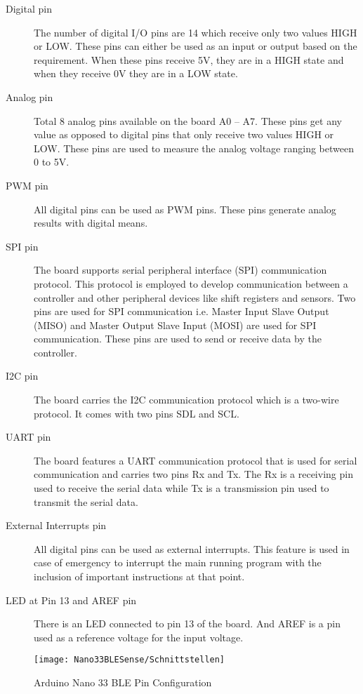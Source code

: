 \begin{description}
  \item[Digital pin] The number of digital I/O pins are 14 which receive only two values HIGH or LOW. These pins can either be used as an input or output based on the requirement. When these pins receive 5V, they are in a HIGH state and when they receive 0V they are in a LOW state.
  \item[Analog pin] Total 8 analog pins available on the board A0 -- A7. These pins get any value as opposed to digital pins that only receive two values HIGH or LOW. These pins are used to measure the analog voltage ranging between 0 to 5V.
  \item[PWM pin] All digital pins can be used as PWM pins. These pins generate analog results with digital means.
  \item[SPI pin] The board supports serial peripheral interface (SPI) communication protocol. This protocol is employed to develop communication between a controller and other peripheral devices like shift registers and sensors. Two pins are used for SPI communication i.e. Master Input Slave Output (MISO) and Master Output Slave Input (MOSI) are used for SPI communication. These pins are used to send or receive data by the controller.
  \item[I2C pin] The board carries the I2C communication protocol which is a two-wire protocol. It comes with two pins SDL and SCL.
  \item[UART pin] The board features a UART communication protocol that is used for serial communication and carries two pins Rx and Tx. The Rx is a receiving pin used to receive the serial data while Tx is a transmission pin used to transmit the serial data.
  \item[External Interrupts pin] All digital pins can be used as external interrupts. This feature is used in case of emergency to interrupt the main running program with the inclusion of important instructions at that point.
  \item[LED at Pin 13 and AREF pin] There is an LED connected to pin 13 of the board. And AREF is a pin used as a reference voltage for the input voltage.
\end{description}



\begin{figure}[ht]
    \centering
    \texttt{[image: Nano33BLESense/Schnittstellen]}
    \caption{Arduino Nano 33 BLE Pin Configuration}
    \label{Schnittstellen}
\end{figure}


